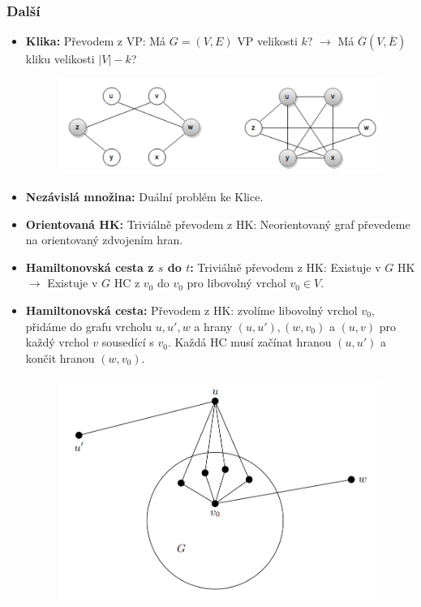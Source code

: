 \documentclass[11pt]{report} %
\numberwithin{equation}{section}
\begin{document}
\subsubsection{Další}
\begin{itemize}
\item \textbf{Klika:} Převodem z VP: Má $G=(V,E)$ VP velikosti $k$? $\to$ Má $\overline{G}(V,\overline{E})$ kliku velikosti $|V| - k$?
\begin{figure}[H]
	\centering
	\includegraphics[]{img/vertex_clique.png}
\end{figure}

\item \textbf{Nezávislá množina:} Duální problém ke Klice.
\item \textbf{Orientovaná HK:} Triviálně převodem z HK: Neorientovaný graf převedeme na orientovaný zdvojením hran.
\item \textbf{Hamiltonovská cesta z $s$ do $t$:} Triviálně převodem z HK: Existuje v $G$ HK $\to$ Existuje v $G$ HC z $v_0$ do $v_0$ pro libovolný vrchol $v_0 \in V$.
\item \textbf{Hamiltonovská cesta:} Převodem z HK: zvolíme libovolný vrchol $v_0$, přidáme do grafu vrcholu $u, u', w$ a hrany $(u,u'), (w,v_0)$ a $(u,v)$ pro každý vrchol $v$ sousedící s $v_0$. Každá HC musí začínat hranou $(u,u')$ a končit hranou $(w,v_0)$.
\begin{figure}[H]
	\centering
	\includegraphics[]{img/hkhc.png}
\end{figure}


\end{itemize}
\end{document}

